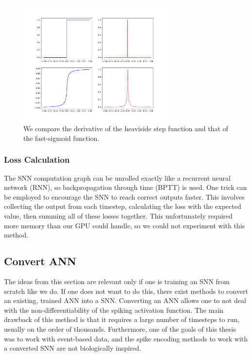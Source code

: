 \documentclass[../taasin.tex]{subfiles}
\begin{document}
\begin{figure}[h]
    \centering
    \includegraphics[width=0.7\textwidth]{figures/surrogate_grad.pdf}
    \caption{We compare the derivative of the heaviside step function and that of the fast-sigmoid function.}
    \label{fig:surrogate_grad}
\end{figure}

\subsubsection{Loss Calculation}

The SNN computation graph can be unrolled exactly like a recurrent neural network (RNN), so backpropagation through time (BPTT) is used. One trick can be employed to encourage the SNN to reach correct outputs faster. This involves collecting the output from each timestep, calculating the loss with the expected value, then summing all of these losses together. This unfortunately required more memory than our GPU could handle, so we could not experiment with this method.


\subsection{Convert ANN}

The ideas from this section are relevant only if one is training an SNN from scratch like we do. If one does not want to do this, there exist methods to convert an existing, trained ANN into a SNN. Converting an ANN allows one to not deal with the non-differentiability of the spiking activation function. The main drawback of this method is that it requires a large number of timesteps to run, usually on the order of thousands. Furthermore, one of the goals of this thesis was to work with event-based data, and the spike encoding methods to work with a converted SNN are not biologically inspired.
\end{document}
